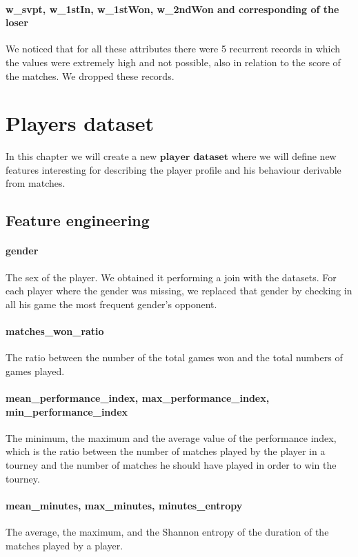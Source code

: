 \documentclass{article}
\begin{document}
\paragraph{w\_svpt, w\_1stIn, w\_1stWon, w\_2ndWon and corresponding of the loser}
We noticed that for all these attributes there were 5 recurrent records in which the values were extremely high and not possible, also in relation to the score of the matches. We dropped these records.

\section{Players dataset}
In this chapter we will create a new $\textbf{player dataset}$ where we will define new features interesting for describing the player profile and his behaviour derivable from matches.
\subsection{Feature engineering}

\paragraph{gender}
The sex of the player. We obtained it performing a join with the datasets. For each player where the gender was missing, we replaced that gender by checking in all his game the most frequent gender's opponent.

\paragraph{matches\_won\_ratio}
The ratio between the number of the total games won and the total numbers of games played.

\paragraph{mean\_performance\_index, max\_performance\_index, min\_performance\_index }
The minimum, the maximum and the average value of the performance index, which is the ratio between the number of matches played by the player in a tourney and the number of matches he should have played in order to win the tourney.

\paragraph{mean\_minutes, max\_minutes, minutes\_entropy }
The average, the maximum, and the Shannon entropy of the duration of the matches played by a player.
\end{document}
